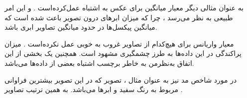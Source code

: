 \begin{boxA}
    به عنوان مثالی دیگر معیار میانگین برای عکس 
    به اشتباه عمل‌کرده‌است . 
    و این امر طبیعی به نظر می‌رسد ، چرا که میزان ابرهای درون تصویر باعث شده است که میانگین پیکسل‌ها در حدود میانگین تصاویر ابری باشد.
\end{boxA}

\begin{boxA}
    معیار واریانس برای هیچ‌کدام از تصاویر غروب به خوبی عمل نکرده‌است . میزان پراکندگی در این داده‌ها به طرز چشمگیری مشهود است.
    همچنین یک بخشی از این اتفاق به‌نظرمن به خاطر برچسب اشتباه بعضی از داده‌ها می‌باشد.
\end{boxA}


\begin{boxA}
    در مورد شاخص مد نیز به عنوان مثال ، تصویر
     که در این تصویر بیشترین فراوانی مربوط به رنگ سفید و ابرها می‌باشد.
     به همین ترتیب تصاویر
     .
\end{boxA}